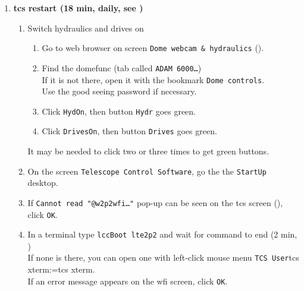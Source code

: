 \documentclass[11pt,fleqn,a4paper]{book}
\makeatletter
\def\menu#1#2{\texttt{#1}\ifx{}#2\else\@for\@x:=#2\do{$\rightarrow$\texttt{\@x}}\fi}
\def\wmenu#1#2{window menu \menu{#1}{#2}}
\def\mmenu#1#2{left-click mouse menu \menu{#1}{#2}}
\def\fetchob{\wmenu{File}{Load OBs,From file...}}
\makeatother
\begin{document}
\begin{enumerate}
\begin{enumerate}
\begin{enumerate}
                \end{enumerate}
          \item In \gls{bob}, execute \texttt{testOB.obd} (1 min)
             \label{list:wfitest}
             \begin{enumerate}
               \item Import it with \fetchob.
               \item Click the \texttt{Start} button. 
             \end{enumerate}
        \end{enumerate}
  \item \textbf{\gls{tcs} restart (18 min, daily, see )}
        \begin{enumerate}
        \item\label{lab:hydron} Switch hydraulics and drives on
             \begin{enumerate}
               \item Go to web browser on screen \texttt{Dome webcam \& hydraulics} (). 
               \item Find the \gls{domefunc} (tab called \texttt{ADAM 6000…})\\
                     If it is not there, open it with the bookmark \texttt{Dome controls}.\\
                     Use the good seeing password if necessary.
               \item Click \texttt{HydOn}, then button \texttt{Hydr} goes green.
               \item Click \texttt{DrivesOn}, then button \texttt{Drives} goes green.
             \end{enumerate}
             It may be needed to click two or three times to get green buttons.
             \label{list:hydr}
          \item On the screen \texttt{Telescope Control Software}, go the the \texttt{StartUp} \gls{desktop}.\label{list:tcs1}
          \item If \texttt{Cannot read "@w2p2wfi…"} pop-up can be seen on the \gls{tcs} screen (), click \texttt{OK}.
          \item In a terminal type \texttt{\gls{lccBoot} \gls{lte2p2}} and wait for command to end (2 min, )\\
                If none is there, you can open one with \mmenu{TCS User}{tcs xterm}.\\
                If an error message appears on the \gls{wfi} screen, click \texttt{OK}. 

\end{enumerate}
\end{enumerate}
\end{document}
